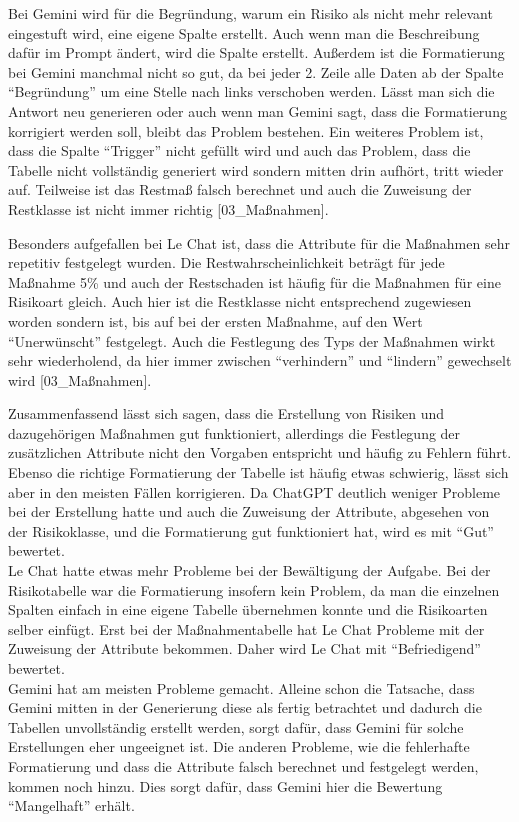 Bei Gemini wird für die Begründung, warum ein Risiko als nicht mehr relevant eingestuft wird, eine eigene Spalte erstellt.
Auch wenn man die Beschreibung dafür im Prompt ändert, wird die Spalte erstellt. Außerdem ist die Formatierung bei Gemini
manchmal nicht so gut, da bei jeder 2. Zeile alle Daten ab der Spalte ``Begründung'' um eine Stelle nach links verschoben werden.
Lässt man sich die Antwort neu generieren oder auch wenn man Gemini sagt, dass die Formatierung korrigiert werden soll, bleibt das 
Problem bestehen. Ein weiteres Problem ist, dass die Spalte ``Trigger'' nicht gefüllt wird und auch das Problem, dass
die Tabelle nicht vollständig generiert wird sondern mitten drin aufhört, tritt wieder auf. Teilweise ist das Restmaß 
falsch berechnet und auch die Zuweisung der Restklasse ist nicht immer richtig [03\_Maßnahmen].

Besonders aufgefallen bei Le Chat ist, dass die Attribute für die Maßnahmen sehr repetitiv festgelegt wurden. Die Restwahrscheinlichkeit
beträgt für jede Maßnahme 5\% und auch der Restschaden ist häufig für die Maßnahmen für eine Risikoart gleich. Auch hier ist die 
Restklasse nicht entsprechend zugewiesen worden sondern ist, bis auf bei der ersten Maßnahme, auf den Wert ``Unerwünscht'' festgelegt. Auch 
die Festlegung des Typs der Maßnahmen wirkt sehr wiederholend, da hier immer zwischen ``verhindern'' und ``lindern'' gewechselt wird [03\_Maßnahmen].

Zusammenfassend lässt sich sagen, dass die Erstellung von Risiken und dazugehörigen Maßnahmen gut funktioniert, allerdings 
die Festlegung der zusätzlichen Attribute nicht den Vorgaben entspricht und häufig zu Fehlern führt. Ebenso die richtige 
Formatierung der Tabelle ist häufig etwas schwierig, lässt sich aber in den meisten Fällen korrigieren. Da ChatGPT deutlich 
weniger Probleme bei der Erstellung hatte und auch die Zuweisung der Attribute, abgesehen von der Risikoklasse, und die 
Formatierung gut funktioniert hat, wird es mit ``Gut'' bewertet.\\
Le Chat hatte etwas mehr Probleme bei der Bewältigung der Aufgabe. Bei der Risikotabelle war die Formatierung insofern kein Problem, da man die 
einzelnen Spalten einfach in eine eigene Tabelle übernehmen konnte und die Risikoarten selber einfügt. Erst 
bei der Maßnahmentabelle hat Le Chat Probleme mit der Zuweisung der Attribute bekommen. Daher wird Le Chat mit 
``Befriedigend'' bewertet.\\
Gemini hat am meisten Probleme gemacht. Alleine schon die Tatsache, dass Gemini mitten in der Generierung diese als 
fertig betrachtet und dadurch die Tabellen unvollständig erstellt werden, sorgt dafür, dass Gemini für solche Erstellungen 
eher ungeeignet ist. Die anderen Probleme, wie die fehlerhafte Formatierung und dass die Attribute falsch berechnet und 
festgelegt werden, kommen noch hinzu. Dies sorgt dafür, dass Gemini hier die Bewertung ``Mangelhaft'' erhält.

